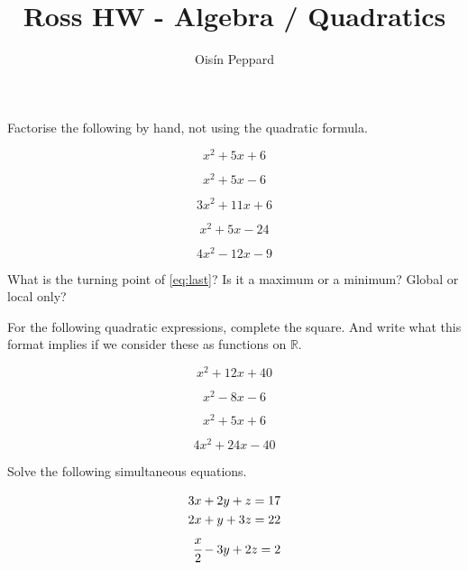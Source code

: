 \documentclass{homework}
\title{Ross HW - Algebra / Quadratics}
\author{Oisín Peppard}
\begin{document}
\maketitle

\exercise
Factorise the following by hand, not using the quadratic formula.

\begin{equation}
    x^2 + 5x + 6 
\end{equation}

\begin{equation}
    x^2 + 5x - 6 
\end{equation}

\begin{equation}
    3x^2 + 11x + 6
\end{equation}

\begin{equation}
    x^2 + 5x - 24
\end{equation}

\begin{equation} \label{eq:last}
    4x^2 - 12x - 9
\end{equation}

What is the turning point of \ref{eq:last}? Is it a maximum or a minimum? Global or local only?


\exercise*
For the following quadratic expressions, complete the square. And write what this format implies if we consider these as functions on $\mathbb{R}$.

\begin{equation}
    x^2 + 12x + 40 
\end{equation}

\begin{equation}
    x^2 - 8x - 6 
\end{equation}

\begin{equation}
    x^2 + 5x + 6
\end{equation}

\begin{equation}
    4x^2 + 24x - 40
\end{equation}

\exercise*
Solve the following simultaneous equations.

\begin{align}
    3x + 2y + z = 17 \\
    2x + y + 3z = 22 \\
    \cfrac{x}{2} - 3y + 2z = 2
\end{align}
\end{document}

